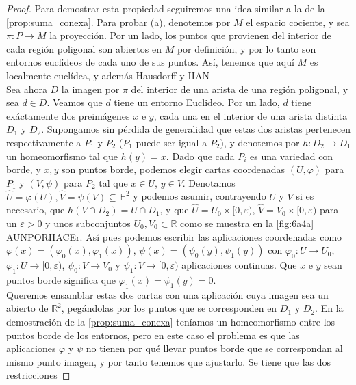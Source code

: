\documentclass[10pt]{report}
\newcommand{\R}{\mathbb{R}}
\theoremstyle{definition}
\begin{document}
\begin{proof} 
Para demostrar esta propiedad seguiremos una idea similar a la de la \autoref{prop:suma_conexa}. Para probar (a), denotemos por $M$ el espacio cociente, y sea $\pi :P\to M$ la proyección.  %
Por un lado, los puntos que provienen del interior de cada región poligonal son abiertos en $M$ por definición, y por lo tanto son entornos euclideos de cada uno de sus puntos. Así, tenemos que aquí $M$ es localmente euclídea, y además Hausdorff y IIAN \\
Sea ahora $D$ la imagen por $\pi$ del interior de una arista de una región poligonal, y sea $d\in D$. Veamos que $d$ tiene un entorno Euclideo. Por un lado, $d$ tiene exáctamente dos preimágenes $x$ e $y$, cada una en el interior de una arista distinta $D_1$ y $D_2$. Supongamos sin pérdida de generalidad que estas dos aristas pertenecen respectivamente a $P_1$ y $P_2$ ($P_1$ puede ser igual a $P_2$), y denotemos por $h:D_2\to D_1$ un homeomorfismo tal que $h(y)=x$. Dado que cada $P_i$ es una variedad con borde, y $x,y$ son puntos borde, podemos elegir cartas coordenadas $(U,\varphi)$  para $P_1$ y $(V,\psi)$ para $P_2$ tal que $x\in U$, $y\in V$. Denotamos $\widehat{U}=\varphi(U),\widehat{V}=\psi(V)\subseteq \mathbb{H}^2$ y podemos asumir, contrayendo $U$ y $V$ si es necesario, que $h(V\cap D_2)=U\cap D_1$, y que $\widehat{U}=U_0\times [0,\varepsilon)$, $\widehat{V}=V_0\times [0,\varepsilon)$  para un $\varepsilon >0$ y unos subconjuntos $U_0, V_0 \subset \R$ como se muestra en la \autoref{fig:6a4a} AUNPORHACEr. Así pues podemos escribir las aplicaciones coordenadas como $\varphi(x)=(\varphi_0(x),\varphi_1(x))$, $\psi(x)=(\psi_0(y),\psi_1(y))$ con $\varphi_0:U\to U_0$, $\varphi_1:U\to [0,\varepsilon)$, $\psi_0:V\to V_0$ y $\psi_1:V\to [0,\varepsilon)$ aplicaciones continuas. Que $x$ e $y$ sean puntos borde significa que $\varphi_1(x)=\psi_1(y)=0$.\\
Queremos ensamblar estas dos cartas con una aplicación cuya imagen sea un abierto de $\R^2$, pegándolas por los puntos que se corresponden en $D_1$ y $D_2$. En la demostración de la \autoref{prop:suma_conexa} teníamos un homeomorfismo entre los puntos borde de los entornos, pero en este caso el problema es que las aplicaciones $\varphi$ y $\psi$ no tienen por qué llevar puntos borde que se correspondan al mismo punto imagen, y por tanto tenemos que ajustarlo. Se tiene que las dos restricciones 

\end{proof}
\end{document}
